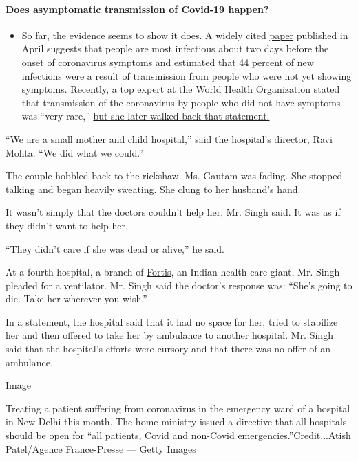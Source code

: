 \begin{itemize}
{  \paragraph{Does asymptomatic transmission of Covid-19
  happen?}\label{does-asymptomatic-transmission-of-covid-19-happen}}

  \begin{itemize}
  \tightlist
  \item
    So far, the evidence seems to show it does. A widely cited
    \href{https://www.nature.com/articles/s41591-020-0869-5}{paper}
    published in April suggests that people are most infectious about
    two days before the onset of coronavirus symptoms and estimated that
    44 percent of new infections were a result of transmission from
    people who were not yet showing symptoms. Recently, a top expert at
    the World Health Organization stated that transmission of the
    coronavirus by people who did not have symptoms was ``very rare,''
    \href{https://www.nytimes.com/2020/06/09/world/coronavirus-updates.html?action=click\&pgtype=Article\&state=default\&region=MAIN_CONTENT_3\&context=storylines_faq\#link-1f302e21}{but
    she later walked back that statement.}
  \end{itemize}
\end{itemize}

``We are a small mother and child hospital,'' said the hospital's
director, Ravi Mohta. ``We did what we could.''

The couple hobbled back to the rickshaw. Ms. Gautam was fading. She
stopped talking and began heavily sweating. She clung to her husband's
hand.

It wasn't simply that the doctors couldn't help her, Mr. Singh said. It
was as if they didn't want to help her.

``They didn't care if she was dead or alive,'' he said.

At a fourth hospital, a branch of
\href{https://www.fortishealthcare.com/}{Fortis}, an Indian health care
giant, Mr. Singh pleaded for a ventilator. Mr. Singh said the doctor's
response was: ``She's going to die. Take her wherever you wish.''

In a statement, the hospital said that it had no space for her, tried to
stabilize her and then offered to take her by ambulance to another
hospital. Mr. Singh said that the hospital's efforts were cursory and
that there was no offer of an ambulance.

Image

Treating a patient suffering from coronavirus in the emergency ward of a
hospital in New Delhi this month. The home ministry issued a directive
that all hospitals should be open for ``all patients, Covid and
non-Covid emergencies.''Credit...Atish Patel/Agence France-Presse ---
Getty Images

